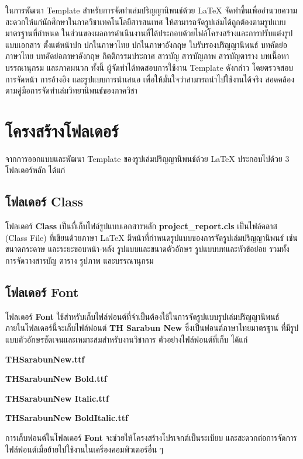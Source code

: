 
\hspace*{1.5em}
ในการพัฒนา Template สำหรับการจัดทำเล่มปริญญานิพนธ์ด้วย LaTeX จัดทำขึ้นเพื่ออำนวยความสะดวกให้แก่นักศึกษาในภาควิชาเทคโนโลยีสารสนเทศ ให้สามารถจัดรูปเล่มได้ถูกต้องตามรูปแบบมาตรฐานที่กำหนด ในส่วนของผลการดำเนินงานที่ได้ประกอบด้วยไฟล์โครงสร้างและการปรับแต่งรูปแบบเอกสาร
ตั้งแต่หน้าปก ปกในภาษาไทย ปกในภาษาอังกฤษ ใบรับรองปริญญานิพนธ์ บทคัดย่อภาษาไทย บทคัดย่อภาษาอังกฤษ กิตติกรรมประกาศ สารบัญ สารบัญภาพ สารบัญตาราง บทเนื้อหา บรรณานุกรม และภาคผนวก
ทั้งนี้ ผู้จัดทำได้ทดสอบการใช้งาน Template ดังกล่าว โดยตรวจสอบการจัดหน้า การอ้างอิง และรูปแบบการนำเสนอ เพื่อให้มั่นใจว่าสามารถนำไปใช้งานได้จริง สอดคล้องตามคู่มือการจัดทำเล่มวิทยานิพนธ์ของภาควิชา
\section{โครงสร้างโฟลเดอร์}
\hspace*{1.5em}
จากการออกแบบและพัฒนา Template ของรูปเล่มปริญญานิพนธ์ด้วย LaTeX ประกอบไปด้วย 3 โฟลเดอร์หลัก ได้แก่ 

\subsection{โฟลเดอร์ Class}
\hspace*{1.5em}
โฟลเดอร์ \textbf{Class} เป็นที่เก็บไฟล์รูปแบบเอกสารหลัก \textbf{project\_report.cls} เป็นไฟล์คลาส (Class File) ที่เขียนด้วยภาษา LaTeX มีหน้าที่กำหนดรูปแบบของการจัดรูปเล่มปริญญานิพนธ์ เช่น ขนาดกระดาษ และระยะขอบหน้า-หลัง รูปแบบและขนาดตัวอักษร รูปแบบบทและหัวข้อย่อย รวมทั้งการจัดวางสารบัญ ตาราง รูปภาพ และบรรณานุกรม

\subsection{โฟลเดอร์ Font}
\hspace*{1.5em}
โฟลเดอร์ \textbf{Font} ใช้สำหรับเก็บไฟล์ฟอนต์ที่จำเป็นต้องใช้ในการจัดรูปแบบรูปเล่มปริญญานิพนธ์ ภายในโฟลเดอร์นี้จะเก็บไฟล์ฟอนต์ \textbf{TH Sarabun New} ซึ่งเป็นฟอนต์ภาษาไทยมาตรฐาน 
ที่มีรูปแบบตัวอักษรชัดเจนและเหมาะสมสำหรับงานวิชาการ ตัวอย่างไฟล์ฟอนต์ที่เก็บ ได้แก่
\begin{mycustomenum2}
  \item \textbf{THSarabunNew.ttf}
  \item \textbf{THSarabunNew Bold.ttf}
  \item \textbf{THSarabunNew Italic.ttf}
  \item \textbf{THSarabunNew BoldItalic.ttf}
\end{mycustomenum2}
\hspace*{1.5em}
การเก็บฟอนต์ในโฟลเดอร์ \textbf{Font} จะช่วยให้โครงสร้างโปรเจกต์เป็นระเบียบ 
และสะดวกต่อการจัดการไฟล์ฟอนต์เมื่อย้ายไปใช้งานในเครื่องคอมพิวเตอร์อื่น ๆ 

